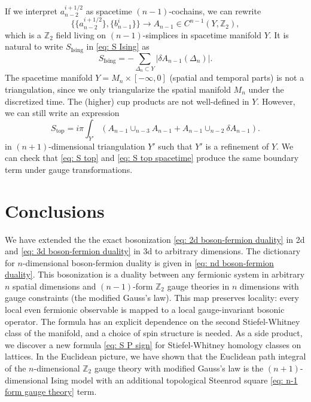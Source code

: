 \documentclass[12pt]{article}
\newcommand{\ZZ}{{\mathbb Z}}
\newcommand{\ra}{\rightarrow}
\begin{document}
If we interpret $a^{i+1/2}_{n-2}$ as spacetime $(n-1)$-cochains, we can rewrite
\begin{equation}
    \{ \{ a^{i+1/2}_{n-2}\} , \{ b^i_{n-1}\} \}  \ra A_{n-1} \in C^{n-1}(Y, \ZZ_2),
\end{equation}
 which is a $\ZZ_2$ field living on $(n-1)$-simplices in spacetime manifold $Y$. It is natural to write $S_{\text{Ising}}$ in \eqref{eq: S Ising} as
\begin{equation}
     S_{\text{Ising}} = -\sum_{\Delta_{n} \subset Y} |\delta A_{n-1} (\Delta_{n})|.
\end{equation}
The spacetime manifold $Y = M_n \times [-\infty,0]$ (spatial and temporal parts) is not a triangulation, since we only triangularize the spatial manifold $M_n$ under the discretized time. The (higher) cup products are not well-defined in $Y$. However, we can still write an expression  
\begin{equation}
     S_{\text{top}} = i \pi \int_{Y'} (A_{n-1} \cup_{n-3} A_{n-1} + A_{n-1} \cup_{n-2} \delta A_{n-1}).
\label{eq: S top spacetime}
\end{equation}
in $(n+1)$-dimensional triangulation $Y'$ such that $Y'$ is a refinement of $Y$. We can check that \eqref{eq: S top} and \eqref{eq: S top spacetime} produce the same boundary term under gauge transformations.

\section{Conclusions}

We have extended the the exact bosonization \eqref{eq: 2d boson-fermion duality} in 2d and \eqref{eq: 3d boson-fermion duality} in 3d to arbitrary dimensions. The dictionary for $n$-dimensional boson-fermion duality is given in \eqref{eq: nd boson-fermion duality}. This bosonization is a duality between any fermionic system in arbitrary $n$ spatial dimensions and $(n-1)$-form $\mathbb{Z}_2$ gauge theories in $n$ dimensions with gauge constraints (the modified Gauss's law). This map preserves locality: every local even fermionic observable is mapped to a local gauge-invariant bosonic operator. The formula has an explicit dependence on the second Stiefel-Whitney class of the manifold, and a choice of spin structure is needed. As a side product, we discover a new formula \eqref{eq: S P sign} for Stiefel-Whitney homology classes on lattices. In the Euclidean picture, we have shown that the Euclidean path integral of the $n$-dimensional $\ZZ_2$ gauge theory with modified Gauss's law is the $(n+1)$-dimensional Ising model with an additional topological Steenrod square \eqref{eq: n-1 form gauge theory} term.
\end{document}

